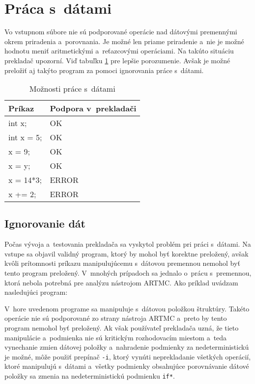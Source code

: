 \section{Práca s~dátami}
\label{sec_data}
Vo vstupnom súbore nie sú podporované operácie nad dátovými premennými okrem priradenia a~porovnania. Je možné len priame priradenie a~nie je možné hodnotu meniť aritmetickými a~reťazcovými operáciami. Na takúto situáciu prekladač upozorní. Viď tabuľku \ref{table:working_not} pre lepšie porozumenie. Avšak je možné preložiť aj takýto program za pomoci ignorovania práce s~dátami.

\begin{table}[H]
\centering
\begin{tabular}{l|l}
\textbf{Príkaz} & \textbf{Podpora v~prekladači} \\ \hline
int x;          & OK                            \\
int x = 5;      & OK                            \\
x = 9;          & OK                            \\
x = y;          & OK                            \\
x = 14*3;       & ERROR                         \\
x += 2;         & ERROR                 
\end{tabular}
\caption{Možnosti práce s~dátami}
\label{table:working_not}
\end{table}

\subsection{Ignorovanie dát}
Počas vývoja a~testovania prekladača sa vyskytol problém pri práci s~dátami. Na vstupe sa objavil validný program, ktorý by mohol byť korektne preložený, avšak kvôli prítomnosti príkazu manipulujúcemu s~dátovou premennou nemohol byť tento program preložený. V~mnohých prípadoch sa jednalo o~prácu s~premennou, ktorá nebola potrebná pre analýzu nástrojom ARTMC. Ako príklad uvádzam nasledujúci program:


\noindent
V~hore uvedenom programe sa manipuluje s~dátovou položkou štruktúry. Takéto operácie nie sú podporované zo strany nástroja ARTMC a~preto by tento program nemohol byť preložený. Ak však používateľ prekladača uzná, že tieto manipulácie a~podmienka nie sú kritickým rozhodovacím miestom a~teda vynechanie zmien dátovej položky a~nahradenie podmienky za nedeterministickú je možné, môže použiť prepínač \texttt{-i}, ktorý vynúti neprekladanie všetkých operácií, ktoré manipulujú s~dátami a~všetky podmienky obsahujúce porovnávanie dátové položky sa zmenia na nedeterministickú podmienku \texttt{if*}.

